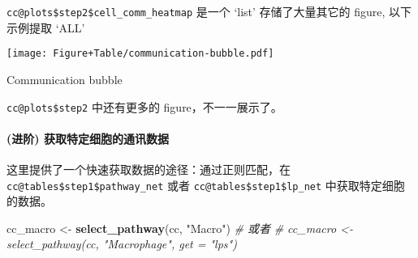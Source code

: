 \documentclass[
]{article}
\newenvironment{Shaded}{\begin{snugshade}}{\end{snugshade}}
\newcommand{\CommentTok}[1]{\textcolor[rgb]{0.56,0.35,0.01}{\textit{#1}}}
\newcommand{\KeywordTok}[1]{\textcolor[rgb]{0.13,0.29,0.53}{\textbf{#1}}}
\newcommand{\NormalTok}[1]{#1}
\newcommand{\OperatorTok}[1]{\textcolor[rgb]{0.81,0.36,0.00}{\textbf{#1}}}
\newcommand{\StringTok}[1]{\textcolor[rgb]{0.31,0.60,0.02}{#1}}
\begin{document}
\texttt{cc@plots\$step2\$cell\_comm\_heatmap} 是一个 `list'
存储了大量其它的 figure, 以下示例提取 `ALL'

\begin{Shaded}
\end{Shaded}

\def\@captype{figure}
\begin{center}
\texttt{[image: Figure+Table/communication-bubble.pdf]}
\caption{Communication bubble}\label{fig:communication-bubble}
\end{center}

\texttt{cc@plots\$step2} 中还有更多的 figure，不一一展示了。

\hypertarget{ux8fdbux9636-ux83b7ux53d6ux7279ux5b9aux7ec6ux80deux7684ux901aux8bafux6570ux636e}{%
\paragraph{(进阶) 获取特定细胞的通讯数据}\label{ux8fdbux9636-ux83b7ux53d6ux7279ux5b9aux7ec6ux80deux7684ux901aux8bafux6570ux636e}}

这里提供了一个快速获取数据的途径：通过正则匹配，在 \texttt{cc@tables\$step1\$pathway\_net}
或者 \texttt{cc@tables\$step1\$lp\_net} 中获取特定细胞的数据。

\begin{Shaded}
\begin{Highlighting}[]
\NormalTok{cc\_macro \textless{}{-}}\StringTok{ }\KeywordTok{select\_pathway}\NormalTok{(cc, }\StringTok{"Macro"}\NormalTok{)}
\CommentTok{\# 或者}
\CommentTok{\# cc\_macro \textless{}{-} select\_pathway(cc, "Macrophage", get = "lps")}
\end{Highlighting}
\end{Shaded}
\end{document}

